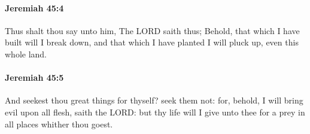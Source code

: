 		\paragraph{Jeremiah 45:4} %
			\label{JEREMIAH-45-4}

			Thus shalt thou say unto him, The LORD saith thus; Behold, that which I have built will I break down, and that which I have planted I will pluck up, even this whole land.


		\paragraph{Jeremiah 45:5} %
			\label{JEREMIAH-45-5}

			And seekest thou great things for thyself? seek them not: for, behold, I will bring evil upon all flesh, saith the LORD: but thy life will I give unto thee for a prey in all places whither thou goest.

